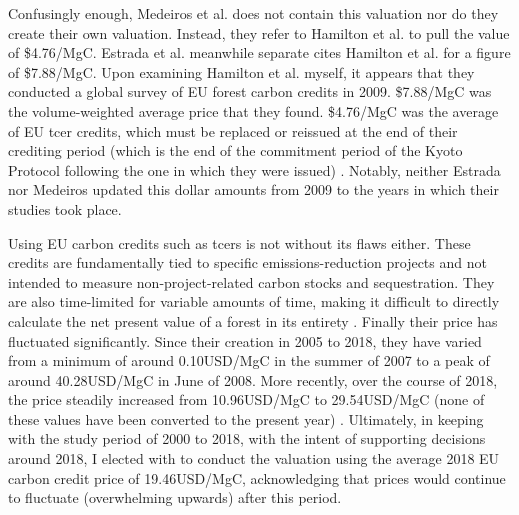 Confusingly enough, Medeiros et al. does not contain this valuation nor do they create their own valuation. Instead, they refer to Hamilton et al. \cite{hamiltonStateForestCarbon2010} to pull the value of \$4.76/MgC. Estrada et al. meanwhile separate cites Hamilton et al. for a figure of \$7.88/MgC. Upon examining Hamilton et al. myself, it appears that they conducted a global survey of EU forest carbon credits in 2009. \$7.88/MgC was the volume-weighted average price that they found. \$4.76/MgC was the average of EU \ac{tcer} credits, which must be replaced or reissued at the end of their crediting period (which is the end of the commitment period of the Kyoto Protocol following the one in which they were issued) \cite{salinasNonpermanence2011}. Notably, neither Estrada nor Medeiros updated this dollar amounts from 2009 to the years in which their studies took place. 

Using EU carbon credits such as \acp{tcer} is not without its flaws either. These credits are fundamentally tied to specific emissions-reduction projects and not intended to measure non-project-related carbon stocks and sequestration. They are also time-limited for variable amounts of time, making it difficult to directly calculate the net present value of a forest in its entirety \cite{salinasNonpermanence2011}. Finally their price has fluctuated significantly. Since their creation in 2005 to 2018, they have varied from a minimum of around 0.10USD/MgC in the summer of 2007 to a peak of around 40.28USD/MgC in June of 2008. More recently, over the course of 2018, the price steadily increased from 10.96USD/MgC to 29.54USD/MgC (none of these values have been converted to the present year) \cite{EUCarbonPermits2023}. Ultimately, in keeping with the study period of 2000 to 2018, with the intent of supporting decisions around 2018, I elected with to conduct the valuation using the average 2018 EU carbon credit price of 19.46USD/MgC, acknowledging that prices would continue to fluctuate (overwhelming upwards) after this period. 

\paragraph{} \leavevmode\newline

